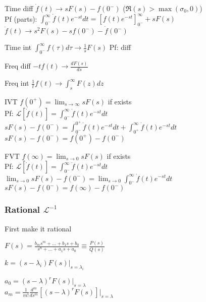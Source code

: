 \documentclass[4pt]{article}
\theoremstyle{definition}
\theoremstyle{definition}
\newcommand{\ra}{\rightarrow}
\newcommand{\ulint}{\int_{0^-}^{\infty}}    %
\begin{document}
\begin{multicols}{3}
    Time diff \(\dot{f}(t) \ra sF(s) - f(0^-)\) ($\Re(s) > \max(\sigma_0, 0)$)\\     %
        Pf (parts): \(\ulint \dot{f}(t) e^{-st} dt = \left[f(t) e^{-st} \right]^{\infty}_{0^-} + s F(s)\)\\    %
    \(\ddot{f}(t) \ra s^2 F(s) - sf(0^-) - \dot{f}(0^-)\)   %

    Time int \(\ulint f(\tau) d\tau \ra \frac{1}{s} F(s)\) Pf: diff     %

    Freq diff \(-t f(t) \ra \frac{dF(s)}{ds}\)          %

    Freq int \(\frac{1}{t}f(t) \ra \int_s^{\infty}F(z) dz\)

    IVT \(f(0^+) = \lim_{s\ra \infty} sF(s)\) if exists\\
        Pf: \(\mathcal L[\dot{f} (t)] = \ulint \dot f(t) e^{-st} dt\)\\ %
        \(sF(s) - f(0^-) = \int_{0^-}^{0^+} \dot f (t) e^{-st} dt + \int _{0^+}^{\infty} \dot f(t) e^{-st} dt \)\\    %
        \(sF(s) - f(0^-) = f(0^+) - f(0^-)\)    %

    FVT \(f(\infty) = \lim_{s\ra 0} sF(s)\) if exists\\
        Pf: \(\mathcal L[\dot{f} (t)] = \ulint \dot f(t) e^{-st} dt\)\\ %
        \(\lim_{s\ra 0} sF(s) - f(0^-) = \lim_{s\ra 0}\ulint \dot f (t) e^{-st} dt\)\\    %
        \(sF(s) - f(0^-) = f(\infty) - f(0^-)\)    %


\subsubsection{Rational $\mathcal L^{-1}$}
    First make it rational      %

    \(F(s) = \frac{b_ms^m + ... + b_1s + b_0}{s^n + ... + a_1s + a_0} \equiv \frac{P(s)}{Q(s)}\)

    \(k = (s-\lambda_i) F(s) | _{s = \lambda_i}\)

    \(a_0 = (s-\lambda)^r F(s)|_{s=\lambda}\)\\
    \(a_m = \frac{1}{m!} \frac{d^m}{ds^m}[(s-\lambda)^r F(s)] |_{s = \lambda}\)


\end{multicols}
\end{document}
